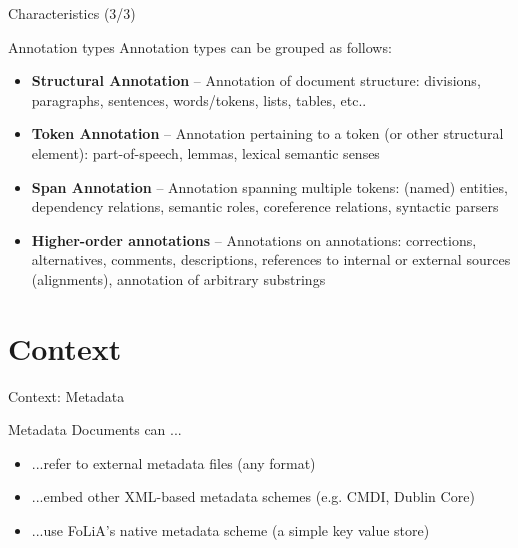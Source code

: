 \documentclass[xcolor=table,10pt,t]{beamer}
\begin{document}
\begin{frame}{Characteristics (3/3)}
    \begin{block}{Annotation types}
        Annotation types can be grouped as follows:
        \begin{itemize}
            \item \textbf{Structural Annotation} -- Annotation of document structure: divisions, paragraphs, sentences, words/tokens, lists, tables, etc..
            \item \textbf{Token Annotation} -- Annotation pertaining to a token (or other structural element): part-of-speech, lemmas, lexical semantic senses
            \item \textbf{Span Annotation} -- Annotation spanning multiple tokens: (named) entities, dependency relations, semantic roles, coreference relations, syntactic parsers
            \item \textbf{Higher-order annotations} -- Annotations on annotations: corrections, alternatives, comments, descriptions, references to internal or external sources (alignments), annotation of arbitrary substrings
        \end{itemize}
    \end{block}
\end{frame}


\section{Context}

\begin{frame}{Context: Metadata}
  \begin{block}{Metadata}
        Documents can ...
        \begin{itemize}
            \item ...refer to external metadata files (any format)
            \item ...embed other XML-based metadata schemes (e.g.  CMDI, Dublin Core)
            \item ...use FoLiA's native metadata scheme (a simple key value store)
        \end{itemize}
  \end{block}
\end{frame}
\end{document}
